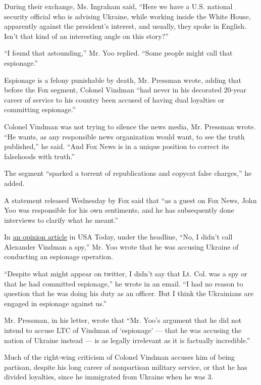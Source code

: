 During their exchange, Ms. Ingraham said, ``Here we have a U.S. national
security official who is advising Ukraine, while working inside the
White House, apparently against the president's interest, and usually,
they spoke in English. Isn't that kind of an interesting angle on this
story?''

``I found that astounding,'' Mr. Yoo replied. ``Some people might call
that espionage.''

Espionage is a felony punishable by death, Mr. Pressman wrote, adding
that before the Fox segment, Colonel Vindman ``had never in his
decorated 20-year career of service to his country been accused of
having dual loyalties or committing espionage.''

Colonel Vindman was not trying to silence the news media, Mr. Pressman
wrote. ``He wants, as any responsible news organization would want, to
see the truth published,'' he said. ``And Fox News is in a unique
position to correct its falsehoods with truth.''

The segment ``sparked a torrent of republications and copycat false
charges,'' he added.

A statement released Wednesday by Fox said that ``as a guest on Fox
News, John Yoo was responsible for his own sentiments, and he has
subsequently done interviews to clarify what he meant.''

In
\href{https://www.usatoday.com/story/opinion/2019/11/01/john-yoo-alexander-vindman-ukraine-espionage-testimony-column/4111757002/}{an
opinion article} in USA Today, under the headline, ``No, I didn't call
Alexander Vindman a spy,'' Mr. Yoo wrote that he was accusing Ukraine of
conducting an espionage operation.

``Despite what might appear on twitter, I didn't say that Lt. Col. was a
spy or that he had committed espionage,'' he wrote in an email. ``I had
no reason to question that he was doing his duty as an officer. But I
think the Ukrainians are engaged in espionage against us.''

Mr. Pressman, in his letter, wrote that ``Mr. Yoo's argument that he did
not intend to accuse LTC of Vindman of `espionage' --- that he was
accusing the nation of Ukraine instead --- is as legally irrelevant as
it is factually incredible.''

Much of the right-wing criticism of Colonel Vindman accuses him of being
partisan, despite his long career of nonpartisan military service, or
that he has divided loyalties, since he immigrated from Ukraine when he
was 3.

